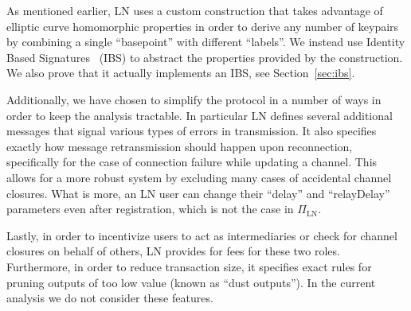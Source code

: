     As mentioned earlier, LN uses a custom construction that takes advantage of
    elliptic curve homomorphic properties in order to derive any number of
    keypairs by combining a single ``basepoint'' with different ``labels''. We
    instead use  Identity Based Signatures~\cite{ibsshamir,ibspaterson} (IBS)
    to abstract the properties provided by the construction.  We also prove that
    it actually implements an IBS, see Section~\ref{sec:ibs}.

    Additionally, we have chosen to simplify the protocol in a number of ways in
    order to keep the analysis tractable. In particular LN defines several
    additional messages that signal various types of errors in transmission. It
    also specifies exactly how message retransmission should happen upon
    reconnection, specifically for the case of connection failure while updating
    a channel. This allows for a more robust system by excluding many cases of
    accidental channel closures. What is more, an LN user can change their
    ``delay'' and ``relayDelay'' parameters even after registration, which is
    not the case in $\Pi_{\mathrm{LN}}$.

    Lastly, in order to incentivize users to act as intermediaries or check for
    channel closures on behalf of others, LN provides for fees for these two
    roles. Furthermore, in order to reduce transaction size, it specifies exact
    rules for pruning outputs of too low value (known as ``dust outputs''). In
    the current analysis we do not consider these features.
  \ifelseieee{}{\end{remark}}
